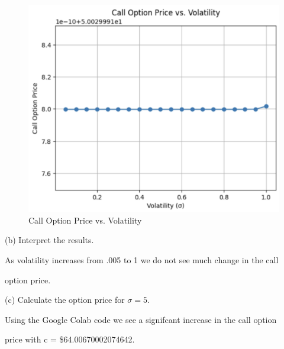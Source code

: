 \documentclass{article}
\begin{document}
\begin{figure}[h]
    \centering
    \includegraphics[width=\textwidth]{Screenshot 2024-06-06 at 9.27.11 PM.png}
    \caption{Call Option Price vs. Volatility}
\end{figure}


(b) Interpret the results.

\vspace{\baselineskip}


As volatility increases from .005 to 1 we do not see much change in the call 

option price.

\vspace{\baselineskip}

(c) Calculate the option price for \( \sigma = 5 \).

\vspace{\baselineskip}

Using the Google Colab code we see a signifcant increase in the call option 

price with c = \$64.00670002074642.
\end{document}
